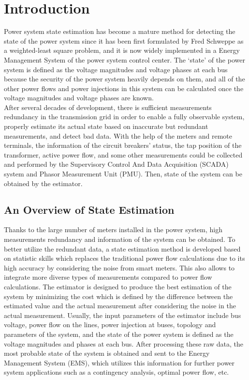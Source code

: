 \chapter{Introduction}

Power system state estimation has become a mature method for detecting the state of the power system since it has been first formulated by Fred Schweppe as a weighted-least square problem, and it is now widely implemented in a Energy Management System of the power system control center. The `state' of the power system is defined as the voltage magnitudes and voltage phases at each bus because the security of the power system heavily depends on them, and all of the other power flows and power injections in this system can be calculated once the voltage magnitudes and voltage phases are known.
\bigskip
\\After several decades of development, there is sufficient measurements redundancy in the transmission grid in order to enable a fully observable system, properly estimate its actual state based on inaccurate but redundant measurements, and detect bad data. With the help of the meters and remote terminals, the information of the circuit breakers' status, the tap position of the transformer, active power flow, and some other measurements could be collected and performed by the Supervisory Control And Data Acquisition (SCADA) system and Phasor Measurement Unit (PMU). Then, state of the system can be obtained by the estimator.
\section{An Overview of State Estimation}
Thanks to the large number of meters installed in the power system, high measurements redundancy and information of the system can be obtained. To better utilize the redundant data, a state estimation method is developed based on statistic skills which replaces the traditional power flow calculations due to its high accuracy by considering the noise from smart meters. This also allows to integrate more diverse types of measurements compared to power flow calculations. The estimator is designed to produce the best estimation of the system by minimizing the cost which is defined by the difference between the estimated value and the actual measurement after considering the noise in the actual measurement. Usually, the input parameters of the estimator include bus voltage, power flow on the lines, power injection at buses, topology and parameters of the system, and the state of the power system is defined as the voltage magnitudes and phases at each bus. After processing these raw data, the most probable state of the system is obtained and sent to the Energy Management System (EMS), which utilizes this information for further power system applications such as a contingency analysis, optimal power flow, etc.
